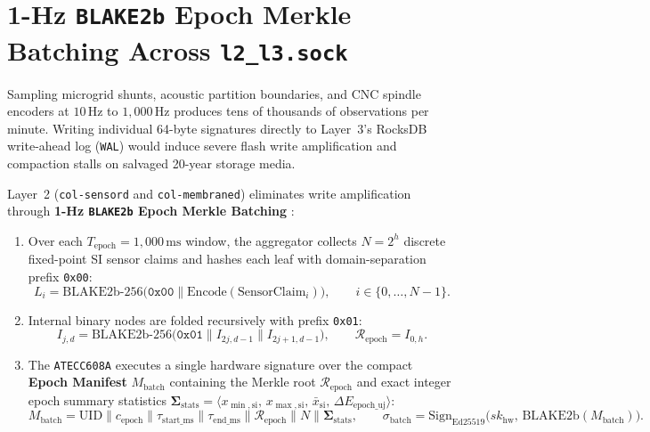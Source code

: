 \section{1-Hz \texttt{BLAKE2b} Epoch Merkle Batching Across \texttt{l2\_l3.sock}}
\label{sec:l2-epoch-merkle-batching}

Sampling microgrid shunts, acoustic partition boundaries, and CNC spindle encoders at $10\,\mathrm{Hz}$ to $1{,}000\,\mathrm{Hz}$ produces tens of thousands of observations per minute. Writing individual 64-byte signatures directly to Layer~3's RocksDB write-ahead log (\texttt{WAL}) would induce severe flash write amplification and compaction stalls on salvaged 20-year storage media.

Layer~2 (\texttt{col-sensord} and \texttt{col-membraned}) eliminates write amplification through \textbf{1-Hz \texttt{BLAKE2b} Epoch Merkle Batching} \parencite{saarinen2013blake2}:
\begin{enumerate}
    \item Over each $T_{\mathrm{epoch}} = 1{,}000\,\mathrm{ms}$ window, the aggregator collects $N = 2^h$ discrete fixed-point SI sensor claims and hashes each leaf with domain-separation prefix \texttt{0x00}:
    \begin{equation}
        L_i = \mathrm{BLAKE2b\text{-}256}\bigl(\mathtt{0x00} \parallel \mathrm{Encode}(\mathrm{SensorClaim}_i)\bigr), \qquad i \in \{0,\dots,N-1\}.
        \label{eq:l2-merkle-leaf-hash}
    \end{equation}
    \item Internal binary nodes are folded recursively with prefix \texttt{0x01}:
    \begin{equation}
        I_{j,d} = \mathrm{BLAKE2b\text{-}256}\bigl(\mathtt{0x01} \parallel I_{2j,d-1} \parallel I_{2j+1,d-1}\bigr), \qquad \mathcal{R}_{\mathrm{epoch}} = I_{0,h}.
        \label{eq:l2-merkle-internal-hash}
    \end{equation}
    \item The \texttt{ATECC608A} executes a single hardware signature over the compact \textbf{Epoch Manifest} $M_{\mathrm{batch}}$ containing the Merkle root $\mathcal{R}_{\mathrm{epoch}}$ and exact integer epoch summary statistics $\mathbf{\Sigma}_{\mathrm{stats}} = \langle x_{\min,\mathrm{si}},\, x_{\max,\mathrm{si}},\, \bar{x}_{\mathrm{si}},\, \Delta E_{\mathrm{epoch\_uj}} \rangle$:
    \begin{equation}
        M_{\mathrm{batch}} = \mathrm{UID} \parallel c_{\mathrm{epoch}} \parallel \tau_{\mathrm{start\_ms}} \parallel \tau_{\mathrm{end\_ms}} \parallel \mathcal{R}_{\mathrm{epoch}} \parallel N \parallel \mathbf{\Sigma}_{\mathrm{stats}}, \qquad \sigma_{\mathrm{batch}} = \mathrm{Sign}_{\mathrm{Ed25519}}\bigl(sk_{\mathrm{hw}},\, \mathrm{BLAKE2b}(M_{\mathrm{batch}})\bigr).
        \label{eq:l2-epoch-manifest-sig}
    \end{equation}
\end{enumerate}


